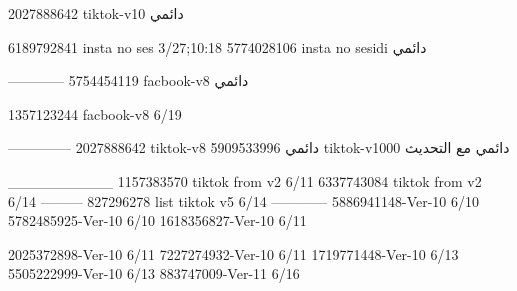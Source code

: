 2027888642 tiktok-v10
دائمي

6189792841 insta no ses
3/27;10:18
5774028106 insta no sesidi
دائمي

------------
5754454119 facbook-v8
دائمي

1357123244 facbook-v8
6/19

--------------
2027888642 tiktok-v8
دائمي
5909533996 tiktok-v1000
دائمي مع التحديث

__________
1157383570 tiktok from v2
6/11
6337743084 tiktok from v2
6/14
---------
827296278 list tiktok v5
6/14
------------
5886941148-Ver-10
6/10
5782485925-Ver-10
6/10
1618356827-Ver-10
6/11

2025372898-Ver-10
6/11
7227274932-Ver-10
6/11
1719771448-Ver-10
6/13
5505222999-Ver-10
6/13
883747009-Ver-11
6/16
